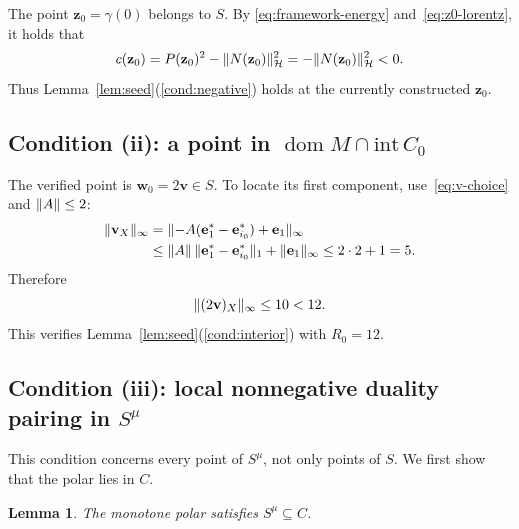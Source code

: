 \documentclass[11pt,a4paper]{article}
\theoremstyle{reportstyle}
\newtheorem{lemma}{Lemma}
\numberwithin{equation}{section}
\DeclareMathOperator{\dom}{dom}
\newcommand{\HH}{\mathcal H}
\newcommand{\be}{\mathbf e}
\newcommand{\bv}{\mathbf v}
\newcommand{\bz}{\mathbf z}
\newcommand{\bw}{\mathbf w}
\DeclarePairedDelimiter{\norm}{\lVert}{\rVert}
\begin{document}
	The point $\bz_0=\gamma(0)$ belongs to $S$. By
	\eqref{eq:framework-energy} and~\eqref{eq:z0-lorentz}, it holds that
	\begin{equation}
		c(\bz_0)=P(\bz_0)^2-\norm{N(\bz_0)}_{\HH}^2
		=-\norm{N(\bz_0)}_{\HH}^2 < 0.
		\label{eq:negative-witness}
	\end{equation}
	Thus Lemma~\ref{lem:seed}\textup{(\ref{cond:negative})} holds at the currently constructed $\bz_0$.

	\subsection{Condition (ii): a point in \texorpdfstring{$\dom M\cap \mathrm{int }\, C_0$}{dom M intersect int C0}}
	\label{subsec:interior}

	The verified point is $\bw_0=2\bv\in S$. To locate its first component,
	use~\eqref{eq:v-choice} and $\norm{A}\le2$:
	\begin{equation}
		\begin{aligned}
			\norm{\bv_X}_\infty
			&=\norm{-A(\be_1^*-\be_{i_0}^*)+\be_1}_\infty\\
			&\le\norm{A}\,\norm{\be_1^*-\be_{i_0}^*}_1
			+\norm{\be_1}_\infty
			\le2\cdot2+1=5.
		\end{aligned}
		\label{eq:v-primal-bound}
	\end{equation}
	Therefore
	\begin{equation}
		\norm{(2\bv)_X}_\infty\le10<12.
		\label{eq:interior-anchor}
	\end{equation}
	This verifies Lemma~\ref{lem:seed}\textup{(\ref{cond:interior})} with
	$R_0=12$.

	\subsection{Condition (iii): local nonnegative duality pairing in \texorpdfstring{$S^\mu$}{the monotone polar}}
	\label{subsec:local}

	This condition concerns every point of $S^\mu$, not only points of $S$.
	We first show that the polar lies in $C$.

	\begin{lemma}
		\label{lem:polar-carrier}
		The monotone polar satisfies $S^\mu\subseteq C$.
	\end{lemma}
\end{document}
